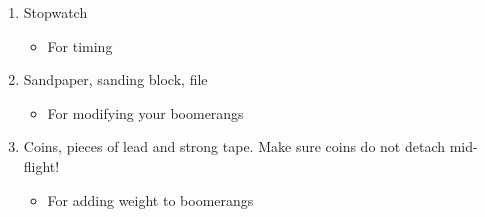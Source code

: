 \begin{center}
{{{{\begin{enumerate}
	\begin{itemize}\setlength{\itemsep}{0pt}\setlength{\parsep}{0pt}\setlength{\topsep}{0pt}
		\item[-] For making notes on the boomerang
	\end{itemize}
\item Stopwatch 
	\begin{itemize}\setlength{\itemsep}{0pt}\setlength{\parsep}{0pt}\setlength{\topsep}{0pt}
		\item[-] For timing
	\end{itemize}
\item Sandpaper, sanding block, file 
	\begin{itemize}\setlength{\itemsep}{0pt}\setlength{\parsep}{0pt}\setlength{\topsep}{0pt}
		\item[-] For modifying your boomerangs
	\end{itemize} 
\item Coins, pieces of lead and strong tape. Make sure coins do not detach mid-flight!
	\begin{itemize}\setlength{\itemsep}{0pt}\setlength{\parsep}{0pt}\setlength{\topsep}{0pt}
		\item[-] For adding weight to boomerangs 
	\end{itemize}
\end{enumerate}
}}
}}
\end{center}
